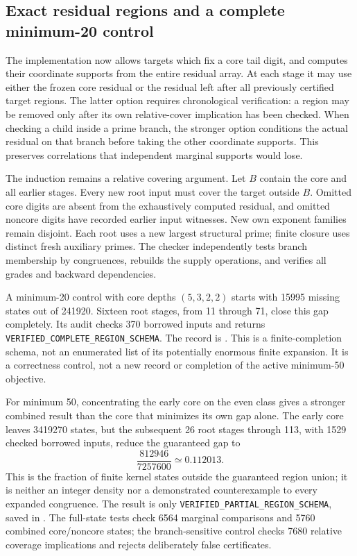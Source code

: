 \documentclass[11pt]{article}
\begin{document}
\subsection{Exact residual regions and a complete minimum-20 control}
The implementation  now allows targets
which fix a core tail digit, and computes their coordinate supports from
the entire residual array. At each stage it may use either the frozen core
residual or the residual left after all previously certified target regions.
The latter option requires chronological verification: a region may be
removed only after its own relative-cover implication has been checked.
When checking a child inside a prime branch, the stronger option conditions
the actual residual on that branch before taking the other coordinate
supports. This preserves correlations that independent marginal supports
would lose.

The induction remains a relative covering argument. Let $B$ contain the
core and all earlier stages. Every new root input must cover the target
outside $B$. Omitted core digits are absent from the exhaustively computed
residual, and omitted noncore digits have recorded earlier input witnesses.
New own exponent families remain disjoint. Each root uses a new largest
structural prime; finite closure uses distinct fresh auxiliary primes.
The checker independently tests branch membership by congruences, rebuilds
the supply operations, and verifies all grades and backward dependencies.

A minimum-20 control with core depths $(5,3,2,2)$ starts with 15995 missing
states out of 241920. Sixteen root stages, from 11 through 71, close this
gap completely. Its audit checks 370 borrowed inputs and returns
\texttt{VERIFIED\_COMPLETE\_REGION\_SCHEMA}. The record is
. This is a finite-completion
schema, not an enumerated list of its potentially enormous finite expansion.
It is a correctness control, not a new record or completion of the active
minimum-50 objective.

For minimum 50, concentrating the early core on the even class gives a
stronger combined result than the core that minimizes its own gap alone.
The early core leaves 3419270 states, but the subsequent 26 root stages
through 113, with 1529 checked borrowed inputs, reduce the guaranteed gap to
\[
  \frac{812946}{7257600}\simeq 0.112013.
\]
This is the fraction of finite kernel states outside the guaranteed region
union; it is neither an integer density nor a demonstrated counterexample
to every expanded congruence. The result is only
\texttt{VERIFIED\_PARTIAL\_REGION\_SCHEMA}, saved in
.
The full-state tests check 6564 marginal comparisons and 5760 combined
core/noncore states; the branch-sensitive control checks 7680 relative
coverage implications and rejects deliberately false certificates.
\end{document}
